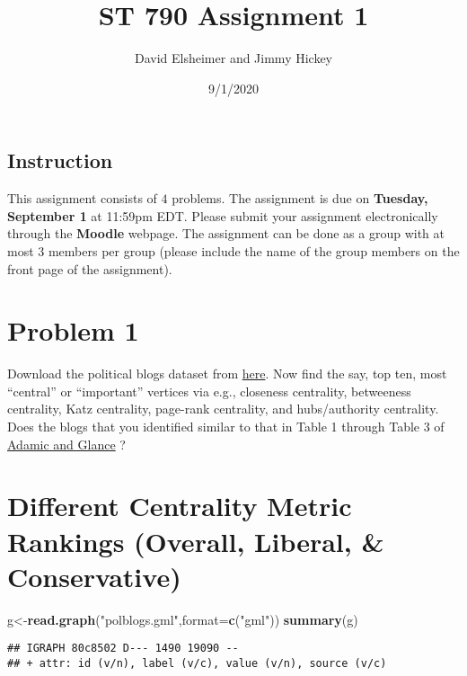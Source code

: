 \documentclass[
]{article}
\title{ST 790 Assignment 1}
\author{David Elsheimer and Jimmy Hickey}
\date{9/1/2020}
\newenvironment{Shaded}{\begin{snugshade}}{\end{snugshade}}
\newcommand{\DataTypeTok}[1]{\textcolor[rgb]{0.13,0.29,0.53}{#1}}
\newcommand{\KeywordTok}[1]{\textcolor[rgb]{0.13,0.29,0.53}{\textbf{#1}}}
\newcommand{\NormalTok}[1]{#1}
\newcommand{\StringTok}[1]{\textcolor[rgb]{0.31,0.60,0.02}{#1}}
\begin{document}
\maketitle

\hypertarget{instruction}{%
\subsection{Instruction}\label{instruction}}

This assignment consists of \(4\) problems. The assignment is due on
\textbf{Tuesday, September 1} at 11:59pm EDT. Please submit your
assignment electronically through the \textbf{Moodle} webpage. The
assignment can be done as a group with at most 3 members per group
(please include the name of the group members on the front page of the
assignment).

\hypertarget{problem-1}{%
\section{Problem 1}\label{problem-1}}

Download the political blogs dataset from
\href{http://www-personal.umich.edu/~mejn/netdata/}{here}. Now find the
say, top ten, most ``central'' or ``important'' vertices via e.g.,
closeness centrality, betweeness centrality, Katz centrality, page-rank
centrality, and hubs/authority centrality. Does the blogs that you
identified similar to that in Table 1 through Table 3 of
\href{http://www.ramb.ethz.ch/CDstore/www2005-ws/workshop/wf10/AdamicGlanceBlogWWW.pdf}{Adamic
and Glance} ?

\hypertarget{different-centrality-metric-rankings-overall-liberal-conservative}{%
\section{Different Centrality Metric Rankings (Overall, Liberal, \&
Conservative)}\label{different-centrality-metric-rankings-overall-liberal-conservative}}

\begin{Shaded}
\begin{Highlighting}[]
\NormalTok{g<-}\KeywordTok{read.graph}\NormalTok{(}\StringTok{"polblogs.gml"}\NormalTok{,}\DataTypeTok{format=}\KeywordTok{c}\NormalTok{(}\StringTok{"gml"}\NormalTok{))}
\KeywordTok{summary}\NormalTok{(g)}
\end{Highlighting}
\end{Shaded}

\begin{verbatim}
## IGRAPH 80c8502 D--- 1490 19090 -- 
## + attr: id (v/n), label (v/c), value (v/n), source (v/c)
\end{verbatim}
\end{document}
